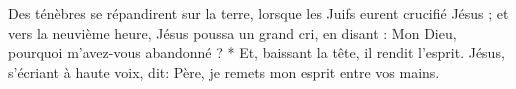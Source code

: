 Des ténèbres se répandirent sur la terre, lorsque les Juifs eurent crucifié Jésus ; et vers la neuvième heure, Jésus poussa un grand cri, en disant : Mon Dieu, pourquoi m’avez-vous abandonné ? * Et, baissant la tête, il rendit l’esprit.
\versseparator
Jésus, s’écriant à haute voix, dit: Père, je remets mon esprit entre vos mains.